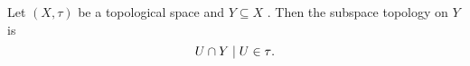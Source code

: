 Let  $ (X, \tau ) $  be a topological space and  $ Y \subseteq X $ . Then
the subspace topology on  $ Y $  is  \[ \\{ U \cap Y \mid U \in  \tau  \\} . \]


